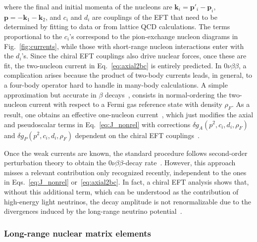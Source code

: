 where the final and initial momenta of the nucleons are $\bm k_i=\bm p'_i-\bm p_i$, $\bm p = -\bm k_1-\bm k_2$, and $c_i$ and $d_i$ are couplings of the EFT that need to be determined by fitting to data or from lattice QCD calculations. The terms proportional to the $c_i$'s correspond to the pion-exchange nucleon diagrams in Fig.~\ref{fig:currents}, while those with short-range nucleon interactions enter with the $d_i$'s. Since the chiral EFT couplings also drive nuclear forces, once these are fit, the two-nucleon current in Eq.~\eqref{eq:axial2bc} is entirely predicted. In $0\nu\beta\beta$, a complication arises because the product of two-body currents leads, in general, to a four-body operator hard to handle in many-body calculations. A simple approximation but accurate in $\beta$ decays~\cite{Gysbers:2019uyb}, consists in normal-ordering the two-nucleon current with respect to a Fermi gas reference state with density $\rho_F$. As a result, one obtains an effective one-nucleon current~\cite{Menendez:2011qq}, which just modifies the axial and pseudoscalar terms in Eq.~\eqref{eq:J_nonrel} with corrections $\delta g_A(p^2,c_i,d_i,\rho_F)$ and $\delta g_P(p^2,c_i,d_i,\rho_F)$ dependent on the chiral EFT couplings~\cite{Hoferichter:2020osn}.



Once the weak currents are known, the standard procedure follows second-order perturbation theory to obtain the $0\nu\beta\beta$-decay rate~\cite{Doi:1985dx}. However, this approach misses a relevant contribution only recognized recently, independent to the ones in Eqs.~\eqref{eq:J_nonrel} or~\eqref{eq:axial2bc}. In fact, a chiral EFT analysis shows that, without this additional term, which can be understood as the contribution of high-energy light neutrinos, the decay amplitude is not renormalizable due to the divergences induced by the long-range neutrino potential~\cite{Cirigliano:2018hja}.

\subsubsection{Long-range nuclear matrix elements}

